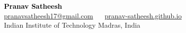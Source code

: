 \documentclass[margin, centered]{res}
\begin{document}
\begin{center}
    \hspace{-\hoffset}
    \vspace{3mm}
    \huge {\textcolor{black}{\textbf{Pranav Satheesh}}}\\
    
    \hspace{-\hoffset}
    \large \href{mailto:pranavsatheesh17@gmail.com}{pranavsatheesh17@gmail.com} ~\textbullet~ \href{https://pranav-satheesh.github.io/}{pranav-satheesh.github.io} \\
    \hspace{-\hoffset}
    Indian Institute of Technology Madras, India
\end{center}
\end{document}
